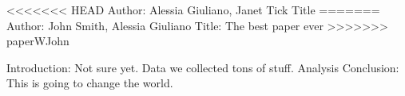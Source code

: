 <<<<<<< HEAD
Author: Alessia Giuliano, Janet Tick
Title
=======
Author: John Smith, Alessia Giuliano
Title: The best paper ever
>>>>>>> paperWJohn

Introduction: Not sure yet.
Data we collected tons of stuff.
Analysis
Conclusion: This is going to change the world.
